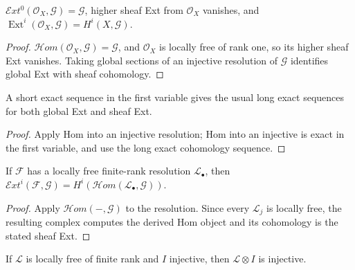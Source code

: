 \begin{proposition}\label{ha-ch3-prop-ext-structure}
$\mathcal E xt^0(\mathcal O_X,\mathcal G)=\mathcal G$, higher sheaf Ext from
$\mathcal O_X$ vanishes, and $\operatorname{Ext}^i(\mathcal O_X,\mathcal G)=H^i(X,\mathcal G)$.

\end{proposition}
\begin{proof}

$\mathcal H om(\mathcal O_X,\mathcal G)=\mathcal G$, and $\mathcal O_X$ is locally free of rank one,
so its higher sheaf Ext vanishes.  Taking global sections of an injective resolution of $\mathcal G$
identifies global Ext with sheaf cohomology.

\end{proof}
\begin{proposition}\label{ha-ch3-prop-ext-les}
A short exact sequence in the first variable gives the usual long exact
sequences for both global Ext and sheaf Ext.

\end{proposition}
\begin{proof}
Apply Hom into an injective resolution; Hom into an injective is
exact in the first variable, and use the long exact cohomology sequence.
\end{proof}
\begin{proposition}\label{ha-ch3-prop-ext-resolution}
If $\mathcal F$ has a locally free finite-rank resolution $\mathcal L_\bullet$,
then $\mathcal E xt^i(\mathcal F,\mathcal G)=H^i(\mathcal H om(\mathcal L_\bullet,\mathcal G))$.

\end{proposition}
\begin{proof}

Apply $\mathcal H om(-,\mathcal G)$ to the resolution.  Since every $\mathcal L_j$ is locally free,
the resulting complex computes the derived Hom object and its cohomology is the stated sheaf Ext.

\end{proof}
\begin{lemma}\label{ha-ch3-lem-tensor-injective}
If $\mathcal L$ is locally free of finite rank and $I$ injective, then
$\mathcal L\otimes I$ is injective.

\end{lemma}
